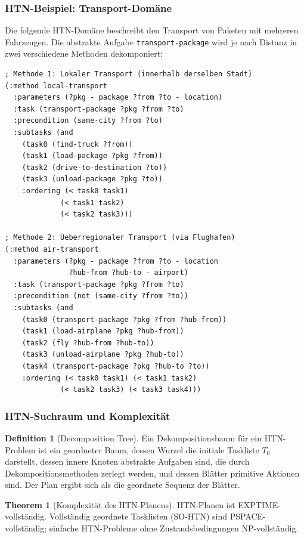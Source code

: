 ﻿\documentclass[a4paper,12pt]{article}
\theoremstyle{definition}
\newtheorem{definition}{Definition}[section]
\newtheorem{theorem}{Theorem}[section]
\begin{document}
\subsubsection{HTN-Beispiel: Transport-Domäne}

Die folgende HTN-Domäne beschreibt den Transport von Paketen mit mehreren Fahrzeugen. Die abstrakte Aufgabe \texttt{transport-package} wird je nach Distanz in zwei verschiedene Methoden dekomponiert:

\begin{lstlisting}[language=PDDL, caption=HTN-Methoden für Transport-Domäne]
; Methode 1: Lokaler Transport (innerhalb derselben Stadt)
(:method local-transport
  :parameters (?pkg - package ?from ?to - location)
  :task (transport-package ?pkg ?from ?to)
  :precondition (same-city ?from ?to)
  :subtasks (and
    (task0 (find-truck ?from))
    (task1 (load-package ?pkg ?from))
    (task2 (drive-to-destination ?to))
    (task3 (unload-package ?pkg ?to))
    :ordering (< task0 task1)
             (< task1 task2)
             (< task2 task3)))

; Methode 2: Ueberregionaler Transport (via Flughafen)
(:method air-transport
  :parameters (?pkg - package ?from ?to - location
               ?hub-from ?hub-to - airport)
  :task (transport-package ?pkg ?from ?to)
  :precondition (not (same-city ?from ?to))
  :subtasks (and
    (task0 (transport-package ?pkg ?from ?hub-from))
    (task1 (load-airplane ?pkg ?hub-from))
    (task2 (fly ?hub-from ?hub-to))
    (task3 (unload-airplane ?pkg ?hub-to))
    (task4 (transport-package ?pkg ?hub-to ?to))
    :ordering (< task0 task1) (< task1 task2)
             (< task2 task3) (< task3 task4)))
\end{lstlisting}

\subsubsection{HTN-Suchraum und Komplexität}

\begin{definition}[Decomposition Tree]
Ein Dekompositionsbaum für ein HTN-Problem ist ein geordneter Baum, dessen Wurzel die initiale Taskliste $T_0$ darstellt, dessen innere Knoten abstrakte Aufgaben sind, die durch Dekompositionsmethoden zerlegt werden, und dessen Blätter primitive Aktionen sind. Der Plan ergibt sich als die geordnete Sequenz der Blätter.
\end{definition}

\begin{theorem}[Komplexität des HTN-Planens]
HTN-Planen ist EXPTIME-vollständig. Vollständig geordnete Tasklisten (SO-HTN) sind PSPACE-vollständig; einfache HTN-Probleme ohne Zustandsbedingungen NP-vollständig.
\end{theorem}
\end{document}
